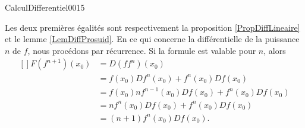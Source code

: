 \begin{corrige}{CalculDifferentiel0015}

	Les deux premières égalités sont respectivement la proposition \ref{PropDiffLineaire} et le lemme \ref{LemDiffProsuid}. En ce qui concerne la différentielle de la puissance $n$ de $f$, nous procédons par récurrence. Si la formule est valable pour $n$, alors
	\begin{equation}
		\begin{aligned}[]
			F(f^{n+1})(x_0)&=D(ff^n)(x_0)\\
			&=f(x_0)Df^n(x_0)+f^n(x_0)Df(x_0)\\
			&=f(x_0)nf^{n-1}(x_0)Df(x_0)+f^n(x_0)Df(x_0)\\
			&=nf^n(x_0)Df(x_0)+f^n(x_0)Df(x_0)\\
			&=(n+1)f^n(x_0)Df(x_0).
		\end{aligned}
	\end{equation}

\end{corrige}

